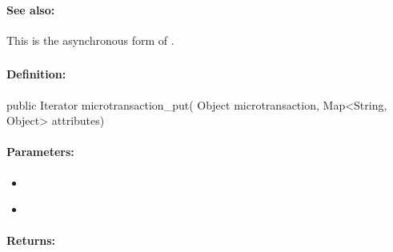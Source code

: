 \paragraph{See also:}  This is the asynchronous form of .

\pagebreak
\subsubsection{}
\label{api:java:microtransaction_put}


\paragraph{Definition:}
\begin{javacode}
public Iterator microtransaction_put(
        Object microtransaction,
        Map<String, Object> attributes)
\end{javacode}

\paragraph{Parameters:}
\begin{itemize}[noitemsep]
\item {}\\

\item {}\\

\end{itemize}

\paragraph{Returns:}

